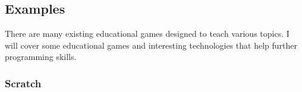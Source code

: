 \documentclass[a4paper,11.5pt]{report}
\numberwithin{figure}{section}
\numberwithin{table}{section}
\numberwithin{equation}{section}
\numberwithin{equation}{section}
\begin{document}












\subsection{Examples}

There are many existing educational games designed to teach various topics. I will cover some educational games and interesting technologies that help further programming skills.

\subsubsection*{Scratch}
\end{document}
